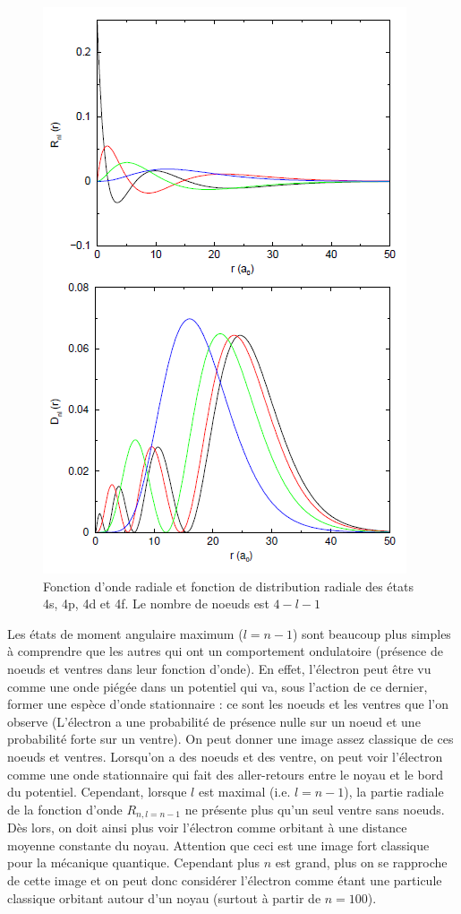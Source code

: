 \begin{figure}[htp]
    \centering
    \includegraphics{Images2/spdf.PNG}
    \caption{Fonction d'onde radiale et fonction de distribution radiale des états 4s, 4p, 4d et 4f. Le nombre de noeuds est $4-l-1$}
    \label{fig:fcx_rad_3}
\end{figure}

Les états de moment angulaire maximum ($l=n-1$) sont beaucoup plus simples à comprendre que les autres qui ont un comportement ondulatoire (présence de noeuds et ventres dans leur fonction d'onde). En effet, l'électron peut être vu comme une onde piégée dans un potentiel qui va, sous l'action de ce dernier, former une espèce d'onde stationnaire : ce sont les noeuds et les ventres que l'on observe (L'électron a une probabilité de présence nulle sur un noeud et une probabilité forte sur un ventre). On peut donner une image assez classique de ces noeuds et ventres. Lorsqu'on a des noeuds et des ventre, on peut voir l'électron comme une onde stationnaire qui fait des aller-retours entre le noyau et le bord du potentiel. Cependant, lorsque $l$ est maximal (i.e. $l=n-1$), la partie radiale de la fonction d'onde $R_{n,l=n-1}$ ne présente plus qu'un seul ventre sans noeuds. Dès lors, on doit ainsi plus voir l'électron comme orbitant à une distance moyenne constante du noyau. Attention que ceci est une image fort classique pour la mécanique quantique. Cependant plus $n$ est grand, plus on se rapproche de cette image et on peut donc considérer l'électron comme étant une particule classique orbitant autour d'un noyau (surtout à partir de $n=100$).

